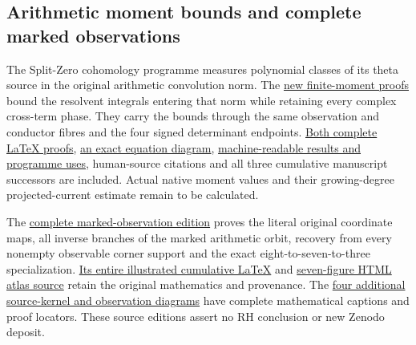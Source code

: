 \documentclass[
]{article}
\newcounter{none} %
\begin{document}
\subsection{Arithmetic moment bounds and complete marked
observations}\label{arithmetic-moment-bounds-and-complete-marked-observations}

The Split-Zero cohomology programme measures polynomial classes of its
theta source in the original arithmetic convolution norm. The
\href{https://github.com/KokunoYumeto/zeta-function-research-reader/blob/main/workbenches/splitzero-tandem/continuations/20260920-native-moment-resolvents/README.md}{new
finite-moment proofs} bound the resolvent integrals entering that norm
while retaining every complex cross-term phase. They carry the bounds
through the same observation and conductor fibres and the four signed
determinant endpoints.
\href{https://github.com/KokunoYumeto/zeta-function-research-reader/blob/main/workbenches/splitzero-tandem/continuations/20260920-native-moment-resolvents/COMPLETE_PROOFS.tex}{Both
complete LaTeX proofs},
\href{https://github.com/KokunoYumeto/zeta-function-research-reader/blob/main/workbenches/splitzero-tandem/continuations/20260920-native-moment-resolvents/FIGURE_CAPTION.md}{an
exact equation diagram},
\href{https://github.com/KokunoYumeto/zeta-function-research-reader/blob/main/workbenches/splitzero-tandem/continuations/20260920-native-moment-resolvents/RESULT_INDEX.json}{machine-readable
results and programme uses}, human-source citations and all three
cumulative manuscript successors are included. Actual native moment
values and their growing-degree projected-current estimate remain to be
calculated.

The
\href{https://github.com/KokunoYumeto/zeta-function-research-reader/blob/main/workbenches/splitzero-tandem/continuations/20260920-marked-observation-illustrated/README.md}{complete
marked-observation edition} proves the literal original coordinate maps,
all inverse branches of the marked arithmetic orbit, recovery from every
nonempty observable corner support and the exact eight-to-seven-to-three
specialization.
\href{https://github.com/KokunoYumeto/zeta-function-research-reader/blob/main/workbenches/splitzero-tandem/continuations/20260920-marked-observation-illustrated/FABLE_TO_ORIGINAL_CONDUCTOR.tex}{Its
entire illustrated cumulative LaTeX} and
\href{https://github.com/KokunoYumeto/zeta-function-research-reader/blob/main/workbenches/splitzero-tandem/continuations/20260920-marked-observation-illustrated/FABLE_VISUAL_ATLAS.html}{seven-figure
HTML atlas source} retain the original mathematics and provenance. The
\href{https://github.com/KokunoYumeto/zeta-function-research-reader/blob/main/workbenches/splitzero-tandem/continuations/20260920-native-moment-resolvents/original_source_figures/FIGURE_CAPTIONS.md}{four
additional source-kernel and observation diagrams} have complete
mathematical captions and proof locators. These source editions assert
no RH conclusion or new Zenodo deposit.
\end{document}
